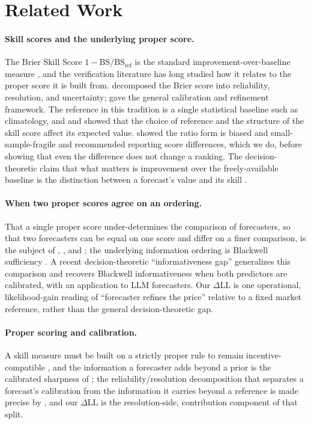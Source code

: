 \documentclass[11pt]{article}
\begin{document}
\section{Related Work}

\paragraph{Skill scores and the underlying proper score.} The Brier Skill Score $1-\mathrm{BS}/\mathrm{BS_{ref}}$ is the standard improvement-over-baseline measure \citep{jolliffe2012}, and the verification literature has long studied how it relates to the proper score it is built from. \citet{murphy1973} decomposed the Brier score into reliability, resolution, and uncertainty; \citet{murphy1987} gave the general calibration and refinement framework. The reference in this tradition is a single statistical baseline such as climatology, and \citet{mason2004} and \citet{weigel2007} showed that the choice of reference and the structure of the skill score affect its expected value. \citet{wheatcroft2019} showed the ratio form is biased and small-sample-fragile and recommended reporting score differences, which we do, before showing that even the difference does not change a ranking. The decision-theoretic claim that what matters is improvement over the freely-available baseline is the distinction between a forecast's value and its skill \citep{murphy1993}.

\paragraph{When two proper scores agree on an ordering.} That a single proper score under-determines the comparison of forecasters, so that two forecasters can be equal on one score and differ on a finer comparison, is the subject of \citet{degroot1983}, \citet{dawid1986}, and \citet{schervish1989}; the underlying information ordering is Blackwell sufficiency \citep{blackwell1953}. A recent decision-theoretic ``informativeness gap'' \citep{feng2025} generalizes this comparison and recovers Blackwell informativeness when both predictors are calibrated, with an application to LLM forecasters. Our $\Delta$LL is one operational, likelihood-gain reading of ``forecaster refines the price'' relative to a fixed market reference, rather than the general decision-theoretic gap.

\paragraph{Proper scoring and calibration.} A skill measure must be built on a strictly proper rule to remain incentive-compatible \citep{gneiting2007jasa}, and the information a forecaster adds beyond a prior is the calibrated sharpness of \citet{gneiting2007jrssb}; the reliability/resolution decomposition that separates a forecast's calibration from the information it carries beyond a reference is made precise by \citet{brocker2009}, and our $\Delta$LL is the resolution-side, contribution component of that split.
\end{document}
